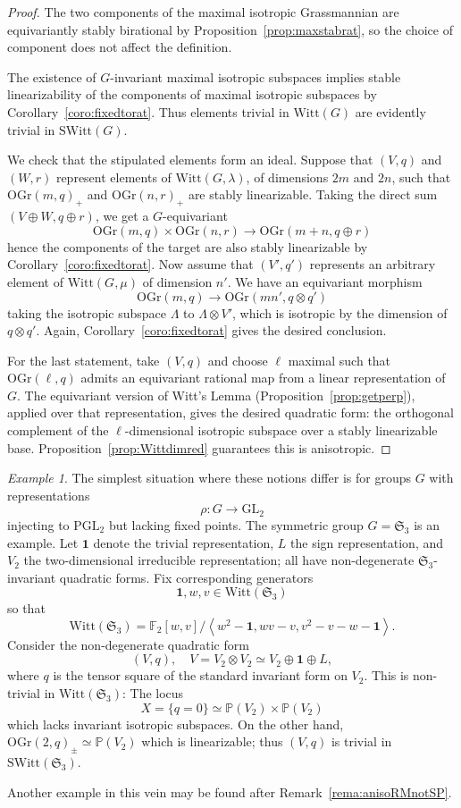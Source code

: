 \documentclass[12pt]{amsart}
\numberwithin{equation}{section}
\newcommand{\ra}{\rightarrow}
\newcommand{\bF}{\mathbb{F}}
\newcommand{\bP}{\mathbb{P}}
\newcommand{\fS}{\mathfrak{S}}
\newcommand{\GL}{\mathrm{GL}}
\newcommand{\OGr}{\mathrm{OGr}}
\newcommand{\PGL}{\mathrm{PGL}}
\newcommand{\SWitt}{\mathrm{SWitt}}
\newcommand{\Witt}{\mathrm{Witt}}
\theoremstyle{plain}
\theoremstyle{definition}
\theoremstyle{remark}
\newtheorem{exam}[prop]{Example}
\begin{document}
\begin{proof}
The two components of the maximal isotropic Grassmannian are equivariantly stably birational by Proposition~\ref{prop:maxstabrat}, so the choice of 
component does not affect the definition.

The existence of $G$-invariant maximal isotropic subspaces
implies stable linearizability of the components of
maximal isotropic subspaces by Corollary~\ref{coro:fixedtorat}.
Thus elements trivial in $\Witt(G)$ are evidently trivial
in $\SWitt(G)$. 

We check that the stipulated elements form an ideal.
Suppose that $(V,q)$ and $(W,r)$ represent elements of 
$\Witt(G,\lambda)$, of dimensions $2m$ and $2n$, such that
$\OGr(m,q)_+$ and $\OGr(n,r)_+$ are stably linearizable.
Taking the direct sum $(V\oplus W,q\oplus r)$,
we get a $G$-equivariant 
$$\OGr(m,q) \times \OGr(n,r) \ra \OGr(m+n,q\oplus r)$$
hence the components of the target are also stably 
linearizable by Corollary~\ref{coro:fixedtorat}.
Now assume that $(V',q')$ represents an arbitrary element
of $\Witt(G,\mu)$ of dimension $n'$. We have an
equivariant morphism
$$\OGr(m,q) \rightarrow \OGr(mn',q\otimes q')$$
taking the isotropic subspace $\Lambda$ to $\Lambda \otimes V'$,
which is isotropic by the dimension of $q\otimes q'$.
Again, Corollary~\ref{coro:fixedtorat} gives the desired
conclusion.

For the last statement, take $(V,q)$ and choose $\ell$ maximal such that $\OGr(\ell,q)$ admits an equivariant rational map from a linear representation of $G$. The equivariant version of Witt's Lemma
(Proposition~\ref{prop:getperp}), 
applied over that representation, gives the desired quadratic form: 
the orthogonal complement of the $\ell$-dimensional
isotropic subspace over a stably linearizable base.
Proposition~\ref{prop:Wittdimred} guarantees this is 
anisotropic.  
\end{proof}



\begin{exam}
The simplest situation where these notions differ is for groups $G$
with representations
$$\rho:G \ra \GL_2$$
injecting to $\PGL_2$ but lacking fixed points. 
The symmetric group $G=\fS_3$ is an example. 
Let ${\mathbf 1}$ denote the trivial representation, $L$ the sign representation, and $V_2$ the two-dimensional
irreducible representation; all have non-degenerate $\fS_3$-invariant quadratic forms. Fix corresponding
generators
$$\mathbf{1},w,v \in \Witt(\fS_3)$$
so that
$$\Witt(\fS_3)=\bF_2[w,v]/\left<w^2-\mathbf{1},
wv-v,v^2-v-w-\mathbf{1}\right>.$$
Consider the non-degenerate quadratic form 
$$(V,q), \quad V = V_2\otimes V_2 \simeq V_2 \oplus \mathbf{1} \oplus L,$$
where $q$ is the tensor square of the standard invariant form 
on $V_2$. This is non-trivial in $\Witt(\fS_3)$: The locus
$$X = \{q=0\} \simeq \bP(V_2) \times \bP(V_2)$$
which lacks invariant isotropic subspaces. On the other
hand, $\OGr(2,q)_{\pm} \simeq \bP(V_2)$ which is linearizable;
thus $(V,q)$ is trivial in $\SWitt(\fS_3)$.
\end{exam}
Another example in this vein may be found after
Remark~\ref{rema:anisoRMnotSP}.
\end{document}
